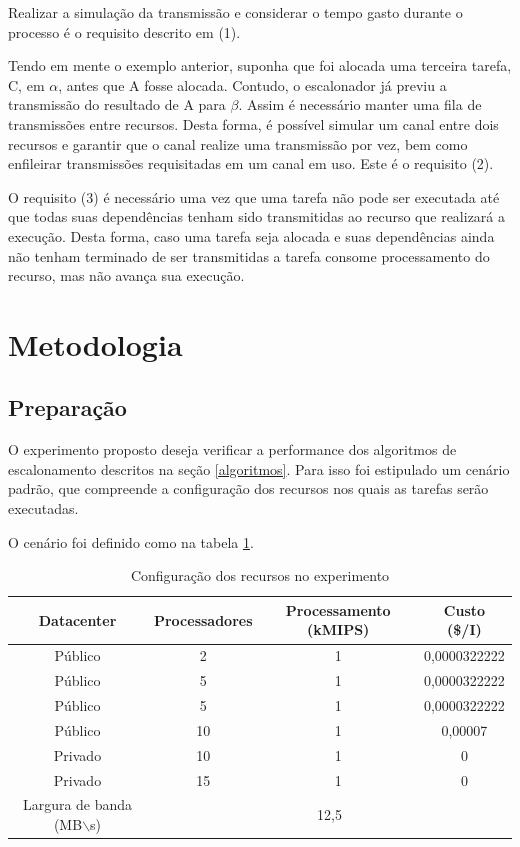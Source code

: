 \documentclass[a4paper,10pt]{article}
\begin{document}
Realizar a simulação da transmissão e considerar o tempo gasto durante o processo é o
requisito descrito em (1).

Tendo em mente o exemplo anterior, suponha que foi alocada uma terceira tarefa, C, em
$\alpha$, antes que A fosse alocada. Contudo, o escalonador já previu a transmissão do
resultado de A para $\beta$. Assim é necessário manter uma fila de transmissões entre
recursos. Desta forma, é possível simular um canal entre dois recursos e garantir que
o canal realize uma transmissão por vez, bem como enfileirar transmissões requisitadas
em um canal em uso. Este é o requisito (2).

O requisito (3) é necessário uma vez que uma tarefa não pode ser executada até que todas
suas dependências tenham sido transmitidas ao recurso que realizará a execução. Desta forma,
caso uma tarefa seja alocada e suas dependências ainda não tenham terminado de ser transmitidas
a tarefa consome processamento do recurso, mas não avança sua execução.

\section{Metodologia}

\subsection{Preparação}

O experimento proposto deseja verificar a performance dos algoritmos de escalonamento
descritos na seção \ref{algoritmos}. Para isso foi estipulado um cenário padrão, que
compreende a configuração dos recursos nos quais as tarefas serão executadas.

O cenário foi definido como na tabela \ref{tab:datacenter}.

\begin{table}
\centering

  \begin{tabular}{|c|c|c|c|}  
    \hline
    Datacenter & Processadores & Processamento (kMIPS) & Custo (\$/I) \\
    \hline
    Público & 2 & 1 & 0,0000322222 \\
    \hline
    Público & 5 & 1 & 0,0000322222 \\
    \hline
    Público & 5 & 1 & 0,0000322222 \\
    \hline
    Público & 10 & 1 & 0,00007 \\
    \hline
    Privado & 10 & 1 & 0 \\
    \hline
    Privado & 15 & 1 & 0 \\
    \hline
    \hline
    Largura de banda (MB$\backslash$s)& \multicolumn{3}{|c|}{12,5} \\
    \hline

  \end{tabular}
  \caption{Configuração dos recursos no experimento}
  \label{tab:datacenter}
\end{table}
\end{document}
